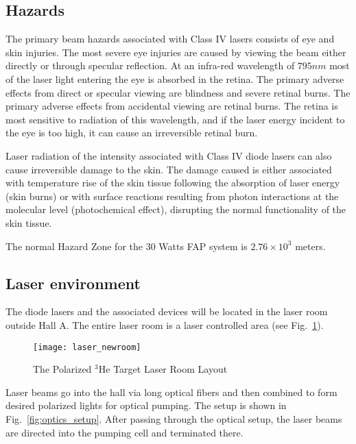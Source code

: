 {\subsection{Hazards}

The primary beam hazards associated with Class IV lasers consists of eye and skin
injuries. The most severe eye injuries are caused by viewing the beam either directly
or through specular reflection. At an infra-red wavelength of $795 nm$ most of the
laser light entering the eye is absorbed in the retina. The primary adverse effects
from direct or specular viewing are blindness and severe retinal burns. The primary
adverse effects from accidental viewing are retinal burns. The retina is most
sensitive to radiation of this wavelength, and if the laser energy incident to the eye
is too high, it can cause an irreversible retinal burn.

Laser radiation of the intensity associated with Class IV diode lasers can also
cause irreversible damage to the skin. The damage caused is either associated with
temperature rise of the skin tissue following the absorption of laser energy (skin
burns) or with surface reactions resulting from photon interactions at the molecular
level (photochemical effect), disrupting the normal functionality of the skin tissue.

The normal Hazard Zone for the 30 Watts FAP system is $2.76 \times 10^3$ meters.


\subsection{Laser environment}

The diode lasers and the associated devices will be located in the
laser room outside Hall A.  The entire laser room is a
laser controlled area (see Fig.~\ref{fig:laser_newroom}).

\begin{figure}
  \centerline{\texttt{[image: laser\_newroom]}}
  \caption[Polarized $^3$He Laser Room Layout]{The Polarized $^3$He Target 
Laser Room Layout}
   \label{fig:laser_newroom} 
\end{figure}

Laser beams go into the hall via long optical fibers
and then combined to form desired polarized lights for optical pumping.
The setup is shown in Fig.~\ref{fig:optics_setup}.
After passing through the optical setup, the laser beams 
are directed into the pumping cell and terminated there. 

}
